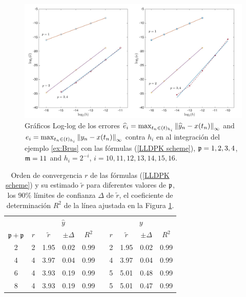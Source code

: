 \begin{figure}[h]
	\begin{center}
		\includegraphics[scale=0.45]{Graphics/lldp/p-plots.jpg}
		\caption{Gráficos Log-log de los errores $\widehat{e}_i=\max_{t_n\in(t)_{h_i}}\left\lVert \widehat{y}_n-x(t_n) \right\rVert_\infty$ and $e_i=\max_{t_n\in(t)_{h_i}}\left\lVert y_n-x(t_n) \right\rVert_\infty$ contra $h_i$ en al integración del ejemplo \ref{ex:Brus} con las fórmulas (\ref{LLDPK scheme}), $\mathfrak{p}=1,2,3,4$, $\mathfrak{m}=11$ and $h_i=2^{-i}$, $i=10,11,12,13,14,15,16$.}
		\label{fig:num-exp-lldp-fix-step:Fig2}
	\end{center}
\end{figure}


\begin{table}[h]
	\centering
	\caption{
		Orden de convergencia $r$ de las fórmulas (\ref{LLDPK scheme}) y su estimado  $\widetilde{r}$ para diferentes valores de $\mathfrak{p}$, los $90\%$ límites de confianza $\Delta$ de $\widetilde {r}$, el coeficiente de determinación $R^2$ de la línea ajustada en la Figura \ref{fig:num-exp-lldp-fix-step:Fig2}.}
		\begin{tabular}{ c  c c c c  c  c c c c}
			\hline
			& \multicolumn{4}{c}{$\widehat{y}$} & & \multicolumn{4}{c}{$y$} \\
			\cline{2-5} \cline{7-10}
			$\mathfrak{p}+\mathfrak{p}$ & $r$ & $\widetilde{r}$ & $\pm\varDelta$ & $R^2$ & & $r$ & $\widetilde{r}$ & $\pm\varDelta$ & $R^2$ \\
			\hline
			2 & 2 & 1.95 & 0.02 & 0.99 & & 2 & 1.95 & 0.02 & 0.99 \\
			4 & 4 & 3.97 & 0.04 & 0.99 & & 4 & 3.97 & 0.04 & 0.99 \\
			6 & 4 & 3.93 & 0.19 & 0.99 & & 5 & 5.01 & 0.48 & 0.99 \\
			8 & 4 & 3.93 & 0.19 & 0.99 & & 5 & 5.01 & 0.47 & 0.99 \\
			\hline
		\end{tabular}
	\label{tab:num-exp-lldp-fix-step:porders}
\end{table}

